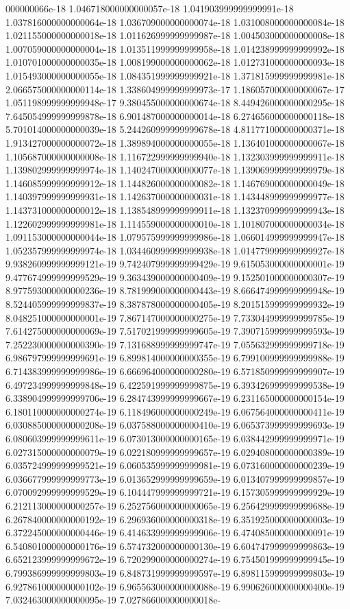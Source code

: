 000000066e-18	1.046718000000000057e-18	1.041903999999999991e-18	1.037816000000000064e-18	1.036709000000000074e-18	1.031008000000000084e-18	1.021155000000000018e-18	1.011626999999999987e-18	1.004503000000000008e-18	1.007059000000000004e-18	1.013511999999999958e-18	1.014238999999999992e-18	1.010701000000000035e-18	1.008199000000000062e-18	1.012731000000000093e-18	1.015493000000000055e-18	1.084351999999999921e-18	1.371815999999999981e-18	2.066575000000000114e-18	1.338604999999999973e-17	1.186057000000000067e-17	1.051198999999999948e-17	9.380455000000000674e-18	8.449426000000000295e-18	7.645054999999999878e-18	6.901487000000000014e-18	6.274656000000000118e-18	5.701014000000000039e-18	5.244260999999999678e-18	4.811771000000000371e-18	1.913427000000000072e-18	1.389894000000000055e-18	1.136401000000000067e-18	1.105687000000000008e-18	1.116722999999999940e-18	1.132303999999999911e-18	1.139802999999999974e-18	1.140247000000000077e-18	1.139069999999999979e-18	1.146085999999999912e-18	1.144826000000000082e-18	1.146769000000000049e-18	1.140397999999999931e-18	1.142637000000000031e-18	1.143448999999999977e-18	1.143731000000000012e-18	1.138548999999999911e-18	1.132370999999999943e-18	1.122602999999999981e-18	1.114559000000000010e-18	1.101807000000000034e-18	1.091153000000000044e-18	1.079575999999999986e-18	1.066014999999999947e-18	1.052357999999999974e-18	1.034460999999999938e-18	1.014779999999999927e-18	9.938260999999999121e-19	9.742407999999999429e-19	9.615053000000000001e-19	9.477674999999999529e-19	9.363439000000000409e-19	9.152501000000000307e-19	8.977593000000000236e-19	8.781999000000000443e-19	8.666474999999999948e-19	8.524405999999999837e-19	8.387878000000000405e-19	8.201515999999999932e-19	8.048251000000000001e-19	7.867147000000000275e-19	7.733044999999999785e-19	7.614275000000000069e-19	7.517021999999999605e-19	7.390715999999999593e-19	7.252230000000000390e-19	7.131688999999999747e-19	7.055632999999999718e-19	6.986797999999999691e-19	6.899814000000000355e-19	6.799100999999999988e-19	6.714383999999999986e-19	6.666964000000000280e-19	6.571850999999999907e-19	6.497234999999999848e-19	6.422591999999999875e-19	6.393426999999999538e-19	6.338904999999999706e-19	6.284743999999999667e-19	6.231165000000000154e-19	6.180110000000000274e-19	6.118496000000000249e-19	6.067564000000000411e-19	6.030885000000000208e-19	6.037588000000000410e-19	6.065373999999999693e-19	6.080603999999999611e-19	6.073013000000000165e-19	6.038442999999999971e-19	6.027315000000000079e-19	6.022180999999999657e-19	6.029408000000000389e-19	6.035724999999999521e-19	6.060535999999999981e-19	6.073160000000000239e-19	6.036677999999999773e-19	6.013652999999999659e-19	6.013407999999999857e-19	6.070092999999999529e-19	6.104447999999999721e-19	6.157305999999999929e-19	6.212113000000000257e-19	6.252756000000000065e-19	6.256429999999999688e-19	6.267840000000000192e-19	6.296936000000000318e-19	6.351925000000000003e-19	6.372245000000000446e-19	6.414633999999999906e-19	6.474085000000000091e-19	6.540801000000000176e-19	6.574732000000000130e-19	6.604747999999999863e-19	6.652123999999999672e-19	6.720299000000000274e-19	6.754501999999999945e-19	6.799386999999999803e-19	6.848731999999999597e-19	6.898115999999999803e-19	6.927861000000000102e-19	6.965563000000000088e-19	6.990626000000000400e-19	7.032463000000000095e-19	7.027866000000000018e-